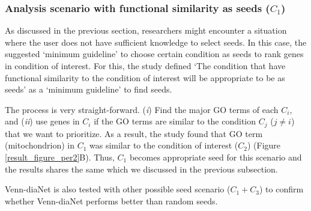 \documentclass[oneside,phd]{snuthesis}
\begin{document}
\subsubsection{Analysis scenario with functional similarity as seeds ($C_1$)} 

As discussed in the previous section, researchers might encounter a situation where the user does not have sufficient knowledge to select seeds. 
In this case, the suggested `minimum guideline' to choose certain condition as seeds to rank genes in condition of interest.
For this, the study defined `The condition that have functional similarity to the condition of interest will be appropriate to be as seeds' as a `minimum guideline' to find seeds. 

The process is very straight-forward. 
(\textit{i}) Find the major GO terms of each $C_i$, 
and (\textit{ii}) use genes in $C_i$ if the GO terms are similar to the condition $C_j$ ($j \ne i$) that we want to prioritize.
As a result, the study found that GO term (mitochondrion) in $C_1$ was similar to the condition of interest ($C_2$) (Figure \ref{result_figure_per2}B). Thus, $C_1$ becomes appropriate seed for this scenario and the results shares the same which we discussed in the previous subsection.

Venn-diaNet is also tested with other possible seed scenario ($C_1 + C_3$) to confirm whether Venn-diaNet performs better than random seeds.
\end{document}
